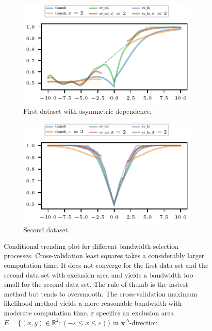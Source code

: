 \documentclass[pdflatex]{sn-jnl}
\theoremstyle{plain}%
\theoremstyle{definition}
\newcommand{\R}{\mathbb{R}}
\newcommand{\diffx}{\mathbf{x}^{\Delta}}
\begin{document}
\begin{figure}
    \centering
    \begin{subfigure}{.48\textwidth}
        \includegraphics{plots/illustrative_examples/cond_prob_plot_bw_butterfly}
        \caption{First dataset with asymmetric dependence.}
    \end{subfigure}
    \begin{subfigure}{.48\textwidth}
        \includegraphics{plots/illustrative_examples/cond_prob_plot_bw_normal}
        \caption{Second dataset. }
    \end{subfigure}
    \caption[Conditional trending plots for different bandwidth selection processes.]{Conditional trending plot for different bandwidth selection processes. Cross-validation least squares takes a considerably larger computation time. It does not converge for the first data set and the second data set with exclusion area and yields a bandwidth too small for the second data set. The rule of thumb is the fastest method but tends to oversmooth. The cross-validation maximum likelihood method yields a more reasonable bandwidth with moderate computation time. $\varepsilon$ specifies an exclusion area $E = \{(x, y) \in \R^2: (-\varepsilon \leq x \leq \varepsilon)\}$ in $\diffx$-direction.}\label{fig:trending-cond-prob-bw}
\end{figure}
\end{document}
